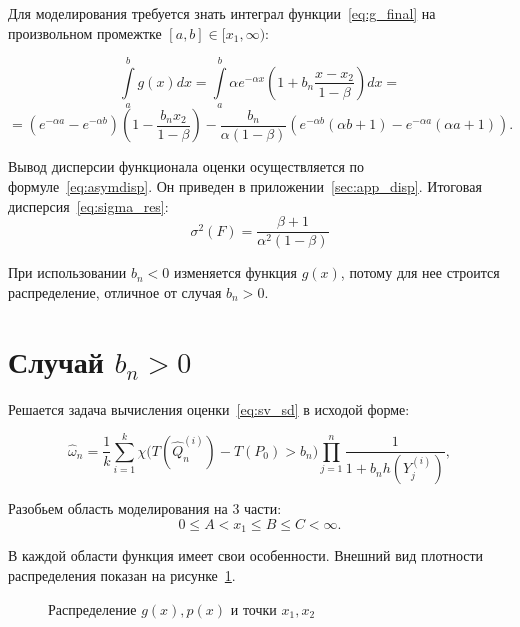 \documentclass[12pt, specialist, subf, substylefile = spbu.rtx]{disser}
\begin{document}
Для моделирования требуется знать интеграл функции~\eqref{eq:g_final} на произвольном промежтке $[a, b] \in [x_1, \infty)$:

$$
\int \limits_a^b g(x)dx=
\int \limits_a^b \alpha e^{-\alpha x}(1+b_n\frac{x-x_2}{1-\beta})dx = 
$$
\begin{equation}\label{eq:gint}
=(e^{-\alpha a}-e^{-\alpha b})(1-\frac{b_n x_2}{1-\beta})-
\frac{b_n}{\alpha(1-\beta)}\left(e^{-\alpha b}(\alpha b+1)-e^{-\alpha a}(\alpha a+1)\right).
\end{equation}

Вывод дисперсии функционала оценки осуществляется по формуле~\eqref{eq:asymdisp}. Он приведен в приложении~\ref{sec:app_disp}. Итоговая дисперсия~\eqref{eq:sigma_res}:
$$
\sigma^2(F)= \frac{\beta + 1}{\alpha^2(1-\beta)}
$$

При использовании $b_n < 0$ изменяется функция $g(x)$, потому для нее строится распределение, отличное от случая $b_n > 0$.


\section{Случай $b_n > 0$}

Решается задача вычисления оценки~\eqref{eq:sv_sd} в исходой форме:

\begin{equation}\label{eq:est_plus}
\hat{\omega}_n=\frac{1}{k} \sum\limits_{i=1}^{k}
\chi \big(T(\hat{Q}^{(i)}_n)-T(P_0) > b_n\big)
\prod\limits_{j=1}^{n} 
\frac{1}{1+b_nh(Y_j^{(i)})},
\end{equation}

Разобьем область моделирования на 3 части: 
$$0 \le A < x_1 \le B \le C < \infty.$$

В каждой области функция имеет свои особенности. Внешний вид плотности распределения показан на рисунке~\ref{ris:plot1}. 

\begin{figure}[h]
\caption{Распределение $g(x), p(x)$ и точки $x_1, x_2$}
\label{ris:plot1}
\end{figure}
\end{document}
